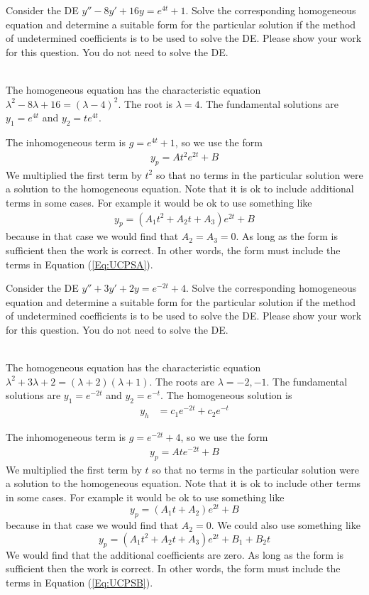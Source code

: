 \ifnum {}
\question[3] Consider the DE $y'' - 8y' + 16y=e^{4t} + 1$. Solve the corresponding homogeneous equation and determine a suitable form for the particular solution if the method of undetermined coefficients is to be used to solve the DE. Please show your work for this question. You do not need to solve the DE. 
\ifnum {} {\color{DarkBlue} \\[12pt] 
The homogeneous equation has the characteristic equation $\lambda^2 - 8\lambda + 16 = (\lambda -4)^2$. The root is $\lambda = 4$. The fundamental solutions are $y_1 = e^{4t}$ and $y_2 = te^{4t}$. 

The inhomogeneous term is $g = e^{4t}+1$, so we use the form 
\begin{align}\label{Eq:UCPSA}
    y_p = At^2e^{2t}+B
\end{align}
We multiplied the first term by $t^2$ so that no terms in the particular solution were a solution to the homogeneous equation. Note that it is ok to include additional terms in some cases. For example it would be ok to use something like
\begin{align}
    y_p = (A_1t^2+A_2t+A_3)e^{2t} + B
\end{align}
because in that case we would find that $A_2=A_3=0$. As long as the form is sufficient then the work is correct. In other words, the form must include the terms in Equation (\ref{Eq:UCPSA}).
} 
\else 
\vspace{8cm}
\fi
\fi 



\ifnum {}
\question[3] Consider the DE $y'' + 3y' + 2y=e^{-2t}+4$. Solve the corresponding homogeneous equation and determine a suitable form for the particular solution if the method of undetermined coefficients is to be used to solve the DE. Please show your work for this question. You do not need to solve the DE. 
\ifnum {} {\color{DarkBlue} \\[12pt] 
The homogeneous equation has the characteristic equation $\lambda^2 + 3\lambda + 2 = (\lambda + 2)(\lambda+1)$. The roots are $\lambda = -2, -1$. The fundamental solutions are $y_1 = e^{-2t}$ and $y_2 = e^{-t}$. The homogeneous solution is
\begin{align}
    y_h &= c_1 e^{-2t} + c_2 e^{-t}
\end{align}

The inhomogeneous term is $g = e^{-2t}+4$, so we use the form 
\begin{align} \label{Eq:UCPSB}
    y_p = Ate^{-2t}+B
\end{align} 
We multiplied the first term by $t$ so that no terms in the particular solution were a solution to the homogeneous equation. Note that it is ok to include other terms in some cases. For example it would be ok to use something like
$$y_p = (A_1t+A_2)e^{2t}+B$$
because in that case we would find that $A_2=0$. We could also use something like 
$$y_p = (A_1t^2+A_2t+A_3)e^{2t}+B_1 + B_2t$$
We would find that the additional coefficients are zero. As long as the form is sufficient then the work is correct. In other words, the form must include the terms in Equation (\ref{Eq:UCPSB}).
} 
\else 
\vspace{8cm}
\fi
\fi 